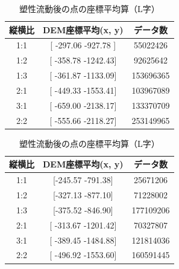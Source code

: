 \documentclass[12pt]{ltjsarticle}
\begin{document}
\begin{table}[htbp]
  \begin{minipage}[c]{.5\textwidth}
    \centering
    \begin{tabular}{ccc} \hline
      縦横比 & DEM座標平均(x, y) & データ数\\\hline
      1:1 & [ -297.06 -927.78 ] & 55022426 \\
      1:2 & [ -358.78 -1242.43] & 92625642 \\
      1:3 & [ -361.87 -1133.09] & 153696365 \\ 
      2:1 & [ -449.33 -1553.41] & 103967089 \\
      3:1 & [ -659.00 -2138.17] & 133370709 \\
      2:2 & [ -555.66 -2118.27] & 253149965 \\
    \end{tabular}
    \caption{塑性流動後の点の座標平均算（星形）}
  \end{minipage}
  \begin{minipage}[c]{.5\textwidth}
    \centering
    \begin{tabular}{ccc} \hline
      縦横比 & DEM座標平均(x, y) & データ数\\\hline
      1:1 & [-245.57 -791.38] & 25671206 \\
      1:2 & [-327.13 -877.10] & 71228002 \\
      1:3 & [-375.52 -846.90] & 177109206 \\ 
      2:1 & [ -313.67 -1201.42] & 70327807 \\
      3:1 & [ -389.45 -1484.88] & 121814036 \\
      2:2 & [ -496.92 -1553.60] & 160591445 \\
    \end{tabular}
    \caption{塑性流動後の点の座標平均算（L字）}
  \end{minipage} \\
\end{table}

\clearpage
\end{document}
